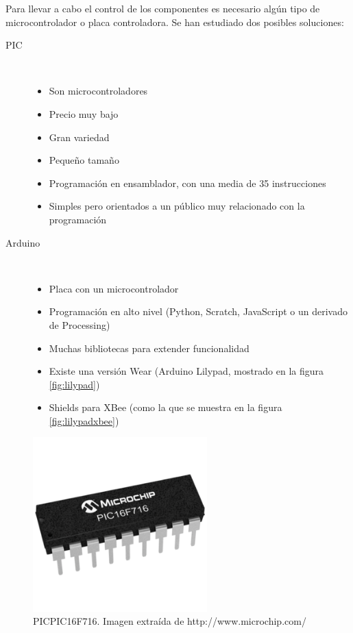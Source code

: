 Para llevar a cabo el control de los componentes es necesario algún tipo de microcontrolador
o placa controladora. Se han estudiado dos posibles soluciones:

\begin{description}
  \item[PIC] \hfill \\
    \begin{itemize}
      \item Son microcontroladores
      \item Precio muy bajo
      \item Gran variedad
      \item Pequeño tamaño
      \item Programación en ensamblador, con una media de 35 instrucciones
      \item Simples pero orientados a un público muy relacionado con la programación
    \end{itemize}
  \item[Arduino] \hfill \\
    \begin{itemize}
      \item Placa con un microcontrolador
      \item Programación en alto nivel (Python, Scratch, JavaScript o un derivado de Processing)
      \item Muchas bibliotecas para extender funcionalidad
      \item Existe una versión Wear (Arduino Lilypad, mostrado en la figura \ref{fig:lilypad})
      \item Shields para XBee (como la que se muestra en la figura \ref{fig:lilypadxbee})
    \end{itemize}
\end{description}


\begin{figure}[htb]
\centering
\includegraphics[width=0.6\textwidth]{./imagenes/pic}
\caption{PICPIC16F716. Imagen extraída de \scriptsize{http://www.microchip.com/}} \label{fig:pic}
\end{figure}

